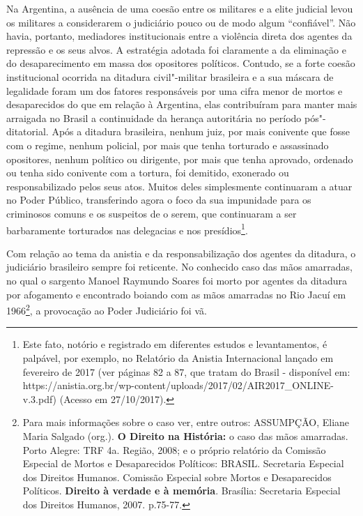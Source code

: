 Na Argentina, a ausência de uma coesão entre os militares e a elite
judicial levou os militares a considerarem o judiciário pouco ou de modo
algum ``confiável''. Não havia, portanto, mediadores institucionais
entre a violência direta dos agentes da repressão e os seus alvos. A
estratégia adotada foi claramente a da eliminação e do desaparecimento
em massa dos opositores políticos. Contudo, se a forte coesão
institucional ocorrida na ditadura civil"-militar brasileira e a sua
máscara de legalidade foram um dos fatores responsáveis por uma cifra
menor de mortos e desaparecidos do que em relação à Argentina, elas
contribuíram para manter mais arraigada no Brasil a continuidade da
herança autoritária no período pós"-ditatorial. Após a ditadura
brasileira, nenhum juiz, por mais conivente que fosse com o regime,
nenhum policial, por mais que tenha torturado e assassinado opositores,
nenhum político ou dirigente, por mais que tenha aprovado, ordenado ou
tenha sido conivente com a tortura, foi demitido, exonerado ou
responsabilizado pelos seus atos. Muitos deles simplesmente continuaram
a atuar no Poder Público, transferindo agora o foco da sua impunidade
para os criminosos comuns e os suspeitos de o serem, que continuaram a
ser barbaramente torturados nas delegacias e nos presídios\footnote{Este
  fato, notório e registrado em diferentes estudos e levantamentos, é
  palpável, por exemplo, no Relatório da Anistia Internacional lançado
  em fevereiro de 2017 (ver páginas 82 a 87, que tratam do Brasil -
  disponível em:
  https://anistia.org.br/wp-content/uploads/2017/02/AIR2017\_ONLINE-v.3.pdf)
  (Acesso em 27/10/2017).}.

Com relação ao tema da anistia e da responsabilização dos agentes da
ditadura, o judiciário brasileiro sempre foi reticente. No conhecido
caso das mãos amarradas, no qual o sargento Manoel Raymundo Soares foi
morto por agentes da ditadura por afogamento e encontrado boiando com as
mãos amarradas no Rio Jacuí em 1966\footnote{Para mais informações sobre
  o caso ver, entre outros: ASSUMPÇÃO, Eliane Maria Salgado (org.).
  \textbf{O Direito na História:} o caso das mãos amarradas. Porto
  Alegre: TRF 4a. Região, 2008; e o próprio relatório da Comissão
  Especial de Mortos e Desaparecidos Políticos: BRASIL. Secretaria
  Especial dos Direitos Humanos. Comissão Especial sobre Mortos e
  Desaparecidos Políticos. \textbf{Direito à verdade e à memória}.
  Brasília: Secretaria Especial dos Direitos Humanos, 2007. p.75-77.}, a
provocação ao Poder Judiciário foi vã.

